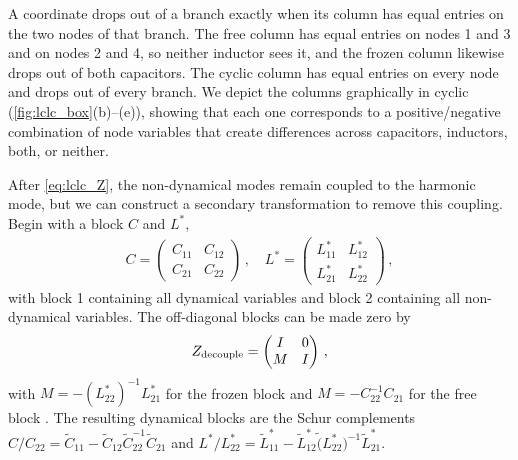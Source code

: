 A coordinate drops out of a branch exactly when its column has equal entries on the two nodes of that branch.
The free column has equal entries on nodes 1 and 3 and on nodes 2 and 4, so neither inductor sees it, and the frozen column likewise drops out of both capacitors.
The cyclic column has equal entries on every node and drops out of every branch.
We depict the columns graphically in cyclic (\cref{fig:lclc_box}(b)--(e)), showing that each one corresponds to a positive/negative combination of node variables that create differences across capacitors, inductors, both, or neither.

After \cref{eq:lclc_Z}, the non-dynamical modes remain coupled to the harmonic mode, but we can construct a secondary transformation to remove this coupling.
Begin with a block $C$ and $L^*$,
\begin{align}
    C = \begin{pmatrix}
        C_{11} & C_{12} \\
        C_{21} & C_{22} 
    \end{pmatrix}\,, \quad 
    L^* = \begin{pmatrix}
        L^*_{11} & L^*_{12} \\
        L^*_{21} & L^*_{22}
    \end{pmatrix} \, ,
\end{align}
with block 1 containing all dynamical variables and block 2 containing all non-dynamical variables.
The off-diagonal blocks can be made zero by
\begin{align}
    Z_{\rm decouple} = \begin{pmatrix}
        I & 0 \\
        M & I
    \end{pmatrix} \, ,
    \label{eq:decouple}
\end{align}
with $M = -(L^*_{22})^{-1}L^*_{21}$ for the frozen block and $M = -C_{22}^{-1}C_{21}$ for the free block \cite{ding_free-mode_2021}.
The resulting dynamical blocks are the Schur complements $C/C_{22} = \tilde C_{11} - \tilde C_{12}\tilde C_{22}^{-1}\tilde C_{21}$ and $L^*/L^*_{22} = \tilde L^*_{11} - \tilde L^*_{12}\tilde (L^*_{22})^{-1}\tilde L^*_{21}$.




